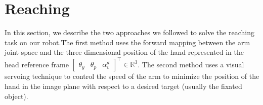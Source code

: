 \section{Reaching}
\label{sec:reaching}

In this section, we describe the two approaches we followed to solve
the reaching task on our robot.The first method 
uses the forward mapping between the arm joint space and the three 
dimensional position of the hand represented in the head reference 
frame $\begin{bmatrix} \theta_y & \theta_p & \alpha_v^d\end{bmatrix}^\top 
\in \mathbb R^3$. 
The second method uses a visual servoing technique to control the 
speed of the arm to minimize the position of the hand in the 
image plane with respect to a desired target (usually the fixated object).

